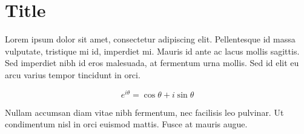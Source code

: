 \documentclass[]{hdsr}
\begin{document}
\appendix

\section{Title}
\label{appendix-customize-this-label}
Lorem ipsum dolor sit amet, consectetur adipiscing elit. Pellentesque id massa vulputate, tristique mi id, imperdiet mi. Mauris id ante ac lacus mollis sagittis. Sed imperdiet nibh id eros malesuada, at fermentum urna mollis. Sed id elit eu arcu varius tempor tincidunt in orci. 

\begin{equation}
e^{i\theta} = \cos \theta + i\sin \theta
\end{equation}

Nullam accumsan diam vitae nibh fermentum, nec facilisis leo pulvinar. Ut condimentum nisl in orci euismod mattis. Fusce at mauris augue. 


\printbibliography
\end{document}
